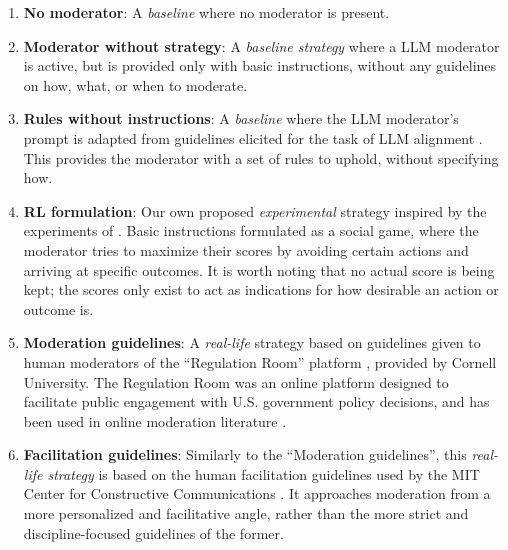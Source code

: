\begin{enumerate}[noitemsep]
    \item \textbf{No moderator}: A \emph{baseline} where no moderator is present.

    \item \textbf{Moderator without strategy}: A \emph{baseline strategy} where a \ac{LLM} moderator is active, but is provided only with basic instructions, without any guidelines on how, what, or when to moderate.

    \item \textbf{Rules without instructions}: A \emph{baseline} where the \ac{LLM} moderator's prompt is adapted from guidelines elicited for the task of \ac{LLM} alignment \cite{collective_constitution}. This provides the moderator with a set of rules to uphold, without specifying how.
    
    \item \textbf{RL formulation}: Our own proposed \emph{experimental} strategy inspired by the experiments of \citet{abdelnabi_negotiations}. Basic instructions formulated as a social game, where the moderator tries to maximize their scores by avoiding certain actions and arriving at specific outcomes. It is worth noting that no actual score is being kept; the scores only exist to act as indications for how desirable an action or outcome is. %

    \item \textbf{Moderation guidelines}: A \emph{real-life} strategy based on guidelines given to human moderators of the “Regulation Room” platform \citep{Cornell_eRulemaking2017}, provided by Cornell University. The Regulation Room was an online platform designed to facilitate public engagement with U.S. government policy decisions, and has been used in online moderation literature \cite{seering_self_moderation, park_et_al_2012_facilitation}.

    \item \textbf{Facilitation guidelines}: Similarly to the “Moderation  guidelines”, this \emph{real-life strategy} is based on the human facilitation guidelines used by the MIT Center for Constructive Communications \cite{dimitra-book}. It approaches moderation from a more personalized and facilitative angle, rather than the more strict and discipline-focused guidelines of the former.
\end{enumerate}


